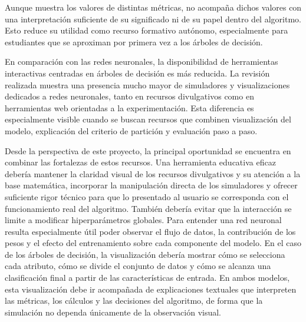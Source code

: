 
Aunque muestra los valores de distintas métricas, no acompaña dichos valores con una interpretación suficiente de su significado ni de su papel dentro del algoritmo.
Esto reduce su utilidad como recurso formativo autónomo, especialmente para estudiantes que se aproximan por primera vez a los árboles de decisión.

En comparación con las redes neuronales, la disponibilidad de herramientas interactivas centradas en árboles de decisión es más reducida.
La revisión realizada muestra una presencia mucho mayor de simuladores y visualizaciones dedicados a redes neuronales, tanto en recursos divulgativos como en herramientas web orientadas a la experimentación.
Esta diferencia es especialmente visible cuando se buscan recursos que combinen visualización del modelo, explicación del criterio de partición y evaluación paso a paso.

Desde la perspectiva de este proyecto, la principal oportunidad se encuentra en combinar las fortalezas de estos recursos.
Una herramienta educativa eficaz debería mantener la claridad visual de los recursos divulgativos y su atención a la base matemática, incorporar la manipulación directa de los simuladores y ofrecer suficiente rigor técnico para que lo presentado al usuario se corresponda con el funcionamiento real del algoritmo.
También debería evitar que la interacción se limite a modificar hiperparámetros globales.
Para entender una red neuronal resulta especialmente útil poder observar el flujo de datos, la contribución de los pesos y el efecto del entrenamiento sobre cada componente del modelo.
En el caso de los árboles de decisión, la visualización debería mostrar cómo se selecciona cada atributo, cómo se divide el conjunto de datos y cómo se alcanza una clasificación final a partir de las características de entrada.
En ambos modelos, esta visualización debe ir acompañada de explicaciones textuales que interpreten las métricas, los cálculos y las decisiones del algoritmo, de forma que la simulación no dependa únicamente de la observación visual.

